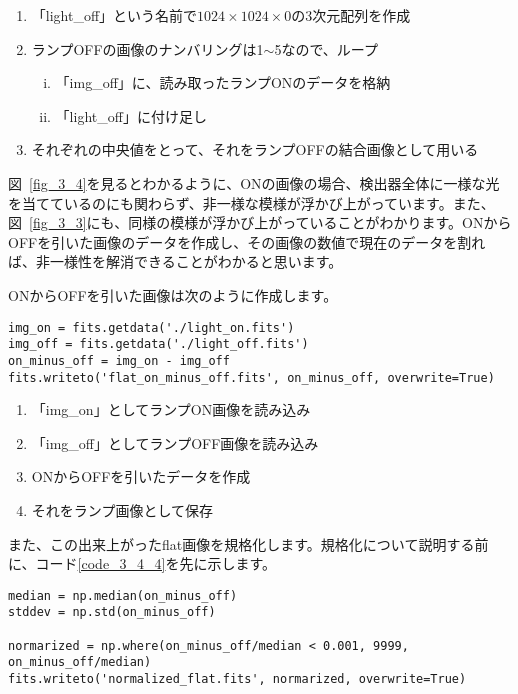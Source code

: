 \begin{enumerate}[(1)]
  \item 「light\_off」という名前で$1024\times1024\times0$の3次元配列を作成
  \item ランプOFFの画像のナンバリングは1$\sim$5なので、ループ
  \begin{enumerate}[(i)]
    \item 「img\_off」に、読み取ったランプONのデータを格納
    \item 「light\_off」に付け足し
  \end{enumerate}
  \item それぞれの中央値をとって、それをランプOFFの結合画像として用いる
\end{enumerate}

図~\ref{fig_3_4}を見るとわかるように、ONの画像の場合、検出器全体に一様な光を当てているのにも関わらず、非一様な模様が浮かび上がっています。また、図~\ref{fig_3_3}にも、同様の模様が浮かび上がっていることがわかります。ONからOFFを引いた画像のデータを作成し、その画像の数値で現在のデータを割れば、非一様性を解消できることがわかると思います。

ONからOFFを引いた画像は次のように作成します。
\begin{lstlisting}[caption=ONの平均画像からOFFの平均画像を引く,label=code_3_4_3]
img_on = fits.getdata('./light_on.fits')
img_off = fits.getdata('./light_off.fits')
on_minus_off = img_on - img_off
fits.writeto('flat_on_minus_off.fits', on_minus_off, overwrite=True)
\end{lstlisting}

\begin{enumerate}[(1)]
  \item 「img\_on」としてランプON画像を読み込み
  \item 「img\_off」としてランプOFF画像を読み込み
  \item ONからOFFを引いたデータを作成
  \item それをランプ画像として保存
\end{enumerate}

また、この出来上がったflat画像を規格化します。規格化について説明する前に、コード\ref{code_3_4_4}を先に示します。
\begin{lstlisting}[caption=フラット画像の規格化,label=code_3_4_4]
median = np.median(on_minus_off)
stddev = np.std(on_minus_off)

normarized = np.where(on_minus_off/median < 0.001, 9999, on_minus_off/median)
fits.writeto('normalized_flat.fits', normarized, overwrite=True)
\end{lstlisting}

